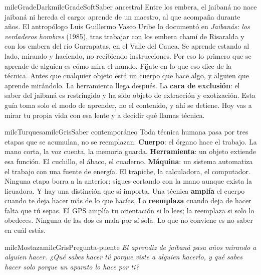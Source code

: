 \documentclass[11pt,letterpaper]{article}
\begin{document}
\begin{softbox}{milcGradeDark}{milcGradeSoft}{Saber ancestral}
Entre los embera, el jaibaná no nace jaibaná ni hereda el cargo: aprende de un maestro, al que acompaña durante años. El antropólogo Luis Guillermo Vasco Uribe lo documentó en \emph{Jaibanás: los verdaderos hombres} (1985), tras trabajar con los embera chamí de Risaralda y con los embera del río Garrapatas, en el Valle del Cauca. Se aprende estando al lado, mirando y haciendo, no recibiendo instrucciones. Por eso lo primero que se aprende de alguien es cómo mira el mundo. Fíjate en lo que eso dice de la técnica. Antes que cualquier objeto está un cuerpo que hace algo, y alguien que aprende mirándolo. La herramienta llega después. La \textbf{cara de exclusión}: el saber del jaibaná es restringido y ha sido objeto de extracción y exotización. Esta guía toma solo el modo de aprender, no el contenido, y ahí se detiene. Hoy vas a mirar tu propia vida con esa lente y a decidir qué llamas técnica.\par{}
\end{softbox}

\begin{softbox}{milcTurquesa}{milcGris}{Saber contemporáneo}
Toda técnica humana pasa por tres etapas que se acumulan, no se reemplazan. \textbf{Cuerpo}: el órgano hace el trabajo. La mano corta, la voz cuenta, la memoria guarda. \textbf{Herramienta}: un objeto extiende esa función. El cuchillo, el ábaco, el cuaderno. \textbf{Máquina}: un sistema automatiza el trabajo con una fuente de energía. El trapiche, la calculadora, el computador. Ninguna etapa borra a la anterior: sigues cortando con la mano aunque exista la licuadora. Y hay una distinción que sí importa. Una técnica \textbf{amplía} el cuerpo cuando te deja hacer más de lo que hacías. Lo \textbf{reemplaza} cuando deja de hacer falta que tú sepas. El GPS amplía tu orientación si lo lees; la reemplaza si solo lo obedeces. Ninguna de las dos es mala por sí sola. Lo que no conviene es no saber en cuál estás.
\end{softbox}

\begin{softbox}{milcMostaza}{milcGris}{Pregunta-puente}
\textit{El aprendiz de jaibaná pasa años mirando a alguien hacer. ¿Qué sabes hacer tú porque viste a alguien hacerlo, y qué sabes hacer solo porque un aparato lo hace por ti?}
\end{softbox}
\end{document}
